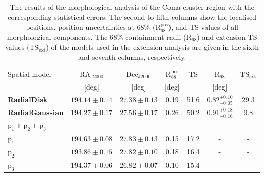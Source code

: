 \documentclass[fleqn,usenatbib]{mnras}
\begin{document}
\begin{table*}
\centering
\caption{The results of the morphological analysis of the Coma cluster region with the corresponding statistical errors. The second to fifth columns show the localised positions, position uncertainties at 68\% ($\mathrm{R_{68}^{pos}}$), and TS values of all morphological components. The 68\% containment radii ($\mathrm{R_{68}}$) and extension TS values ($\mathrm{TS_{ext}}$) of the models used in the extension analysis are given in the sixth and seventh columns, respectively.}
\label{tab:table1}
\begin{tabular}{lcccccc}
    \hline  
    Spatial model & $\mathrm{RA_{J2000}}$ & $\mathrm{Dec_{J2000}}$ & $\mathrm{R_{68}^{pos}}$ & TS & $\mathrm{R_{68}}$ & $\mathrm{TS_{ext}}$  \vspace{1mm}\\
    & [deg]& [deg] & [deg] &  & [deg] &\\
    \hline
    \textbf{RadialDisk}  & $194.14\pm0.14$ & $27.38\pm0.13$ & 0.19 & 51.6 & $0.82^{+0.10}_{-0.05}$ & 29.3\vspace{1mm}\\
    \textbf{RadialGaussian} & $194.27\pm0.17$ & $27.56\pm0.17$ & 0.26 & 50.2 & $0.91^{+0.18}_{-0.16}$ & 9.8\vspace{1mm}\\
    \textbf{$\boldsymbol{\mathrm{p_1+p_2+p_3}}$} \\
    $\mathrm{p_1}$  & $194.63\pm0.08$ & $27.83\pm0.13$ & 0.15 & 17.2 & - & -\\
    $\mathrm{p_2}$  & $193.86\pm0.15$ & $27.82\pm0.10$ & 0.18 & 16.4 & - & -\\
    $\mathrm{p_3}$  & $194.37\pm0.06$ & $26.82\pm0.07$ & 0.10 & 15.4 & - & -\\
    \hline
\end{tabular}
\end{table*}
\end{document}
